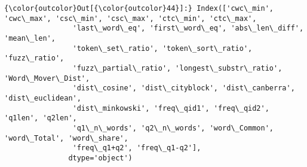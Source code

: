 \documentclass[11pt]{article}
\begin{document}
\begin{Verbatim}[commandchars=\\\{\}]
{\color{outcolor}Out[{\color{outcolor}44}]:} Index(['cwc\_min', 'cwc\_max', 'csc\_min', 'csc\_max', 'ctc\_min', 'ctc\_max',
                'last\_word\_eq', 'first\_word\_eq', 'abs\_len\_diff', 'mean\_len',
                'token\_set\_ratio', 'token\_sort\_ratio', 'fuzz\_ratio',
                'fuzz\_partial\_ratio', 'longest\_substr\_ratio', 'Word\_Mover\_Dist',
                'dist\_cosine', 'dist\_cityblock', 'dist\_canberra', 'dist\_euclidean',
                'dist\_minkowski', 'freq\_qid1', 'freq\_qid2', 'q1len', 'q2len',
                'q1\_n\_words', 'q2\_n\_words', 'word\_Common', 'word\_Total', 'word\_share',
                'freq\_q1+q2', 'freq\_q1-q2'],
               dtype='object')
\end{Verbatim}
            
\end{document}
